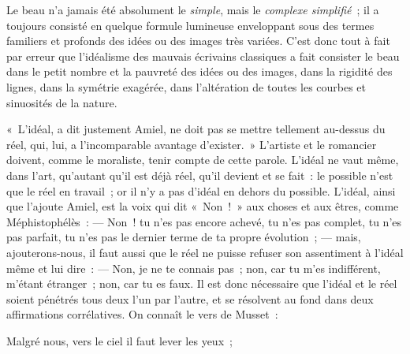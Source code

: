 \documentclass[french,twoside]{book} %
\newenvironment{quoteblock}%
  {\begin{quoting}}
  {\end{quoting}}
\newenvironment{quotebar}{%
    \def\FrameCommand{{\color{rubric!10!}\vrule width 0.5em} \hspace{0.9em}}%
    \def\OuterFrameSep{\itemsep} %
    \MakeFramed {\advance\hsize-\width \FrameRestore}
  }%
  {%
    \endMakeFramed
  }
\renewenvironment{quoteblock}%
  {%
    \savenotes
    \setstretch{0.9}
    \normalfont
    \begin{quotebar}
  }
  {%
    \end{quotebar}
    \spewnotes
  }
\begin{document}
Le beau n’a jamais été absolument le \emph{simple}, mais le \emph{complexe simplifié} ; il a toujours consisté en quelque formule lumineuse enveloppant sous des termes familiers et profonds des idées ou des images très variées. C’est donc tout à fait par erreur que l’idéalisme des mauvais écrivains classiques a fait consister le beau dans le petit nombre et la pauvreté des idées ou des images, dans la rigidité des lignes, dans la symétrie exagérée, dans l’altération de toutes les courbes et sinuosités de la nature.\par
« L’idéal, a dit justement Amiel, ne doit pas se mettre tellement au-dessus du réel, qui, lui, a l’incomparable avantage d’exister. » L’artiste et le romancier doivent, comme le moraliste, tenir compte de cette parole. L’idéal ne vaut même, dans l’art, qu’autant qu’il est déjà réel, qu’il devient et se fait : le possible n’est que le réel en travail ; or il n’y a pas d’idéal en dehors du possible. L’idéal, ainsi que l’ajoute Amiel, est la voix qui dit « Non ! » aux choses et aux êtres, comme Méphistophélès : — Non ! tu n’es pas encore achevé, tu n’es pas complet, tu n’es pas parfait, tu n’es pas le dernier terme de ta propre évolution ; — mais, ajouterons-nous, il faut aussi que le réel ne puisse refuser son assentiment à l’idéal même et lui dire : — Non, je ne te connais pas ; non, car tu m’es indifférent, m’étant étranger ; non, car tu es faux. Il est donc nécessaire que l’idéal et le réel soient pénétrés tous deux l’un par l’autre, et se résolvent au fond dans deux affirmations corrélatives. On connaît le vers de Musset :\par

\begin{quoteblock}
 \noindent Malgré nous, vers le ciel il faut lever les yeux ;
 \end{quoteblock}
\end{document}
